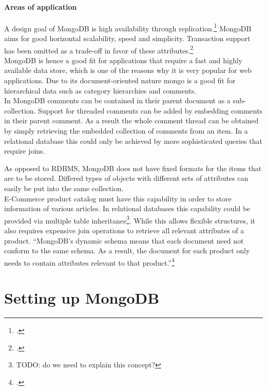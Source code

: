 \paragraph{Areas of application}
A design goal of MongoDB is high availability through
replication.\footcite[Cf.][3]{Plugge_2010}
MongoDB aims for good horizontal scalability, speed and simplicity. Transaction
support has been omitted as a trade-off in favor of these
attributes.\footcite[Cf.][5]{Plugge_2010}\\
MongoDB is hence a good fit for applications that require a fast and highly
available data store, which is one of the reasons why it is very popular for web
applications. Due to its document-oriented nature mongo is a good fit for
hierarchical data such as category hierarchies and comments.\\
In MongoDB comments can be contained in their parent document as a
sub-collection. Support for threaded comments can be added by embedding comments
in their parent comment. As a result the whole comment thread can be obtained
 by simply retrieving the embedded collection of comments from an item.
In a relational database this could only be achieved by more sophisticated
queries that require joins.

As opposed to RDBMS, MongoDB does not have fixed formats for the items that
are to be stored. Differed types of objects with different sets of attributes
can easily be put into the same collection. \\
E-Commerce product catalog must have this capability in order to store information
of various articles. In relational databases this capability could be provided
via multiple table inheritance\footnote{TODO: do we need to explain this concept?}.
While this allows flexible structures, it also requires expensive join operations 
to retrieve all relevant attributes of a product.
``MongoDB’s dynamic schema means that each document need not conform to the same
schema. As a result, the document for each product only needs to contain
attributes relevant to that product.''\footcite[][]{mongo_product_catalog}

    
\FloatBarrier
\clearpage
\section{Setting up MongoDB}
\label{sec:setup}

